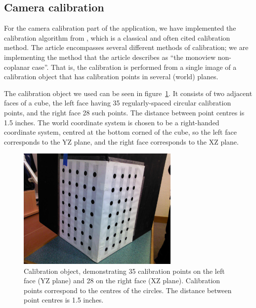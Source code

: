 
\subsection{Camera calibration}
\label{sec:calibration}

For the camera calibration part of the application, we have
implemented the calibration algorithm from \cite{TSAI}, which is a
classical and often cited calibration method. The article encompasses
several different methods of calibration; we are implementing the
method that the article describes as ``the monoview non-coplanar
case''. That is, the calibration is performed from a single image
of a calibration object that has calibration points in several (world)
planes.

The calibration object we used can be seen in figure~\ref{fig:calib-object}.
It consists of two adjacent faces of a cube, the left face having 35 regularly-spaced circular calibration points,
and the right face 28 such points. The distance between point centres is 1.5
inches. The world coordinate system is chosen to be a right-handed
coordinate system, centred at the bottom corned of the cube, so the
left face corresponds to the YZ plane, and the right face corresponds
to the XZ plane.

\begin{figure}[hb]
  \centering
  \includegraphics[width=0.7\textwidth]{figures/calibration-object}
  \caption[Calibration object]{Calibration object, demonstrating 35 calibration points on the left face (YZ plane) and 28 on the right face (XZ plane). Calibration points correspond to the centres of the circles. The distance between point centres is 1.5 inches.}
  \label{fig:calib-object}
\end{figure}

